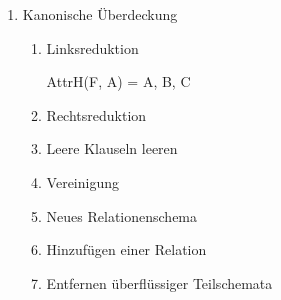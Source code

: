 \documentclass{lehramt-informatik}
\begin{document}
\begin{enumerate}
\item Kanonische Überdeckung

\begin{enumerate}
\item Linksreduktion

AttrH(F, A) = {A, B, C}


\item Rechtsreduktion


\item Leere Klauseln leeren


\item Vereinigung

\item Neues Relationenschema


\item Hinzufügen einer Relation
\item Entfernen überflüssiger Teilschemata

\end{enumerate}
\end{enumerate}

%
\end{document}
